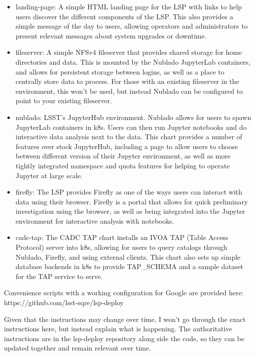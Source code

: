 \documentclass[11pt,twoside]{article}
\begin{document}
\begin{itemize}

\item landing-page: A simple HTML landing page for the LSP with links to help users
discover the different components of the LSP.  This also provides a simple message of
the day to users, allowing operators and administrators to present relevant
messages about system upgrades or downtime.

\item fileserver: A simple NFSv4 fileserver that provides shared storage for
home directories and data.  This is mounted by the Nublado JupyterLab containers,
and allows for persistent storage between logins, as well as a place to centrally
store data to process.  For those with an existing fileserver in the environment,
this won't be used, but instead Nublado can be configured to point to your existing
fileserver.

\item nublado: LSST's JupyterHub environment.  Nublado allows for users to spawn
JupyterLab containers in k8s.  Users can then run Jupyter notebooks and do interactive
data analysis next to the data.  This chart provides a number of
features over stock JupyterHub, including a page to allow users to choose between
different version of their Jupyter environment, as well as more tightly integrated 
namespace and quota features for helping to operate Jupyter at large scale.

\item firefly: The LSP provides Firefly as one of the ways users can interact with
data using their browser.  Firefly is a portal that allows for quick preliminary
investigation using the browser, as well as being integrated into the Jupyter
environment for interactive analysis with notebooks.

\item cadc-tap: The CADC TAP chart installs an IVOA TAP (Table Access Protocol)
server into k8s, allowing for users to query catalogs through Nublado, Firefly,
and using external clients.  This chart also sets up simple database backends
in k8s to provide TAP\_SCHEMA and a sample dataset for the TAP service to serve.

\end{itemize}

Convenience scripts with a working configuration for Google are provided here:
https://github.com/lsst-sqre/lsp-deploy

Given that the instructions may change over time, I won't go through the exact
instructions here, but instead explain what is happening.  The authoritative instructions
are in the lsp-deploy repository along side the code, so they can be updated together
and remain relevant over time.
\end{document}
